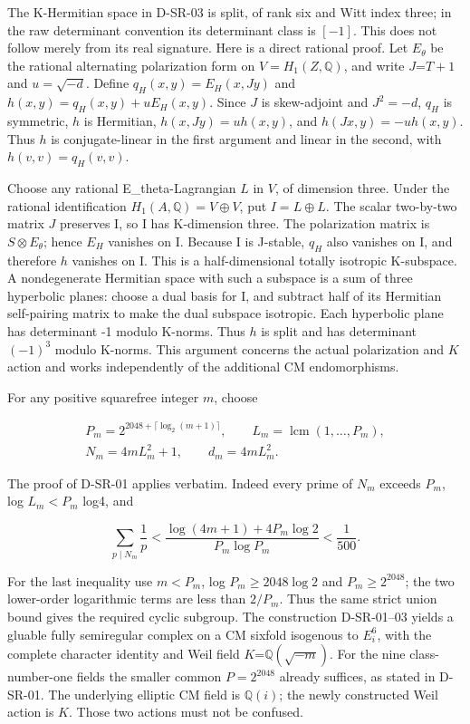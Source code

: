The K-Hermitian space in D-SR-03 is split, of rank six and Witt index three; in the raw determinant convention its determinant class is \([-1]\). This does not follow merely from its real signature. Here is a direct rational proof. Let \(E_\theta\) be the rational alternating polarization form on \(V=H_1(Z,\mathbb Q)\), and write \(J\)=\(T+1\) and \(u=\sqrt{-d}\). Define \(q_H(x,y)=E_H(x,Jy)\) and \(h(x,y)=q_H(x,y)+uE_H(x,y)\). Since \(J\) is skew-adjoint and \(J^2=-d\), \(q_H\) is symmetric, \(h\) is Hermitian, \(h(x,Jy)=u h(x,y)\), and \(h(Jx,y)=-u h(x,y)\). Thus \(h\) is conjugate-linear in the first argument and linear in the second, with \(h(v,v)=q_H(v,v)\).

Choose any rational E\_theta-Lagrangian \(L\) in \(V\), of dimension three. Under the rational identification \(H_1(A,\mathbb Q)=V\oplus V\), put \(I=L\oplus L\). The scalar two-by-two matrix \(J\) preserves I, so I has K-dimension three. The polarization matrix is \(S\otimes E_\theta\); hence \(E_H\) vanishes on I. Because I is J-stable, \(q_H\) also vanishes on I, and therefore \(h\) vanishes on I. This is a half-dimensional totally isotropic K-subspace. A nondegenerate Hermitian space with such a subspace is a sum of three hyperbolic planes: choose a dual basis for I, and subtract half of its Hermitian self-pairing matrix to make the dual subspace isotropic. Each hyperbolic plane has determinant -1 modulo K-norms. Thus \(h\) is split and has determinant \((-1)^3\) modulo K-norms. This argument concerns the actual polarization and \(K\) action and works independently of the additional CM endomorphisms.

For any positive squarefree integer \(m\), choose

\[
\begin{gathered}P_m=2^{2048+\lceil\log_2(m+1)\rceil},\qquad L_m=\operatorname{lcm}(1,\ldots,P_m),\\N_m=4mL_m^2+1,\qquad d_m=4mL_m^2.\end{gathered}
\]

The proof of D-SR-01 applies verbatim. Indeed every prime of \(N_m\) exceeds \(P_m\), log \(L_m<P_m\) log4, and

\[
\sum_{p\mid N_m}\frac1p<\frac{\log(4m+1)+4P_m\log2}{P_m\log P_m}<\frac1{500}.
\]

For the last inequality use \(m<P_m\), log \(P_m\geq2048\log2\) and \(P_m\geq2^{2048}\); the two lower-order logarithmic terms are less than \(2/P_m\). Thus the same strict union bound gives the required cyclic subgroup. The construction D-SR-01--03 yields a gluable fully semiregular complex on a CM sixfold isogenous to \(E_i^6\), with the complete character identity and Weil field \(K\)=\(\mathbb Q(\sqrt{-m})\). For the nine class-number-one fields the smaller common \(P=2^{2048}\) already suffices, as stated in D-SR-01. The underlying elliptic CM field is \(\mathbb Q(i)\); the newly constructed Weil action is \(K\). Those two actions must not be confused.

